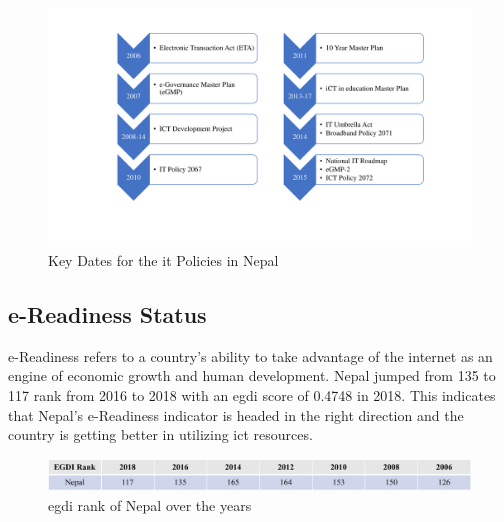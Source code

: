 \documentclass{home_assignment}
\begin{document}
    \begin{figure}[H]
        \centering
        \includegraphics[width=0.9\linewidth]{../Figures/policy.pdf}
        \caption{Key Dates for the \acrshort{it} Policies in Nepal}
        \label{fig:policy}
    \end{figure}
    \subsection{e-Readiness Status}
    e-Readiness refers to a country's ability to take advantage of the internet as an engine of economic growth and human development. Nepal jumped from 135 to 117 rank from 2016 to 2018 with an \acrshort{egdi} score of 0.4748 in 2018. This indicates that Nepal's e-Readiness indicator is headed in the right direction and the country is getting better in utilizing \acrshort{ict} resources.  
    \begin{figure}[H]
        \centering
        \includegraphics[width=\linewidth]{../Figures/egdi.pdf}
        \caption{\acrfull{egdi} rank of Nepal over the years}
        \label{fig:egdi}
    \end{figure}
\end{document}
